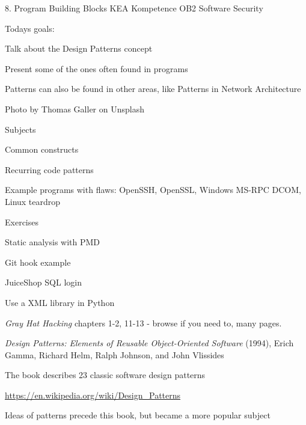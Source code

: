 \documentclass[Screen16to9,17pt]{foils}
\begin{document}
\mytitlepage
{8. Program Building Blocks}
{KEA Kompetence OB2 Software Security}




Todays goals:
\begin{list2}
\item Talk about the Design Patterns concept
\item Present some of the ones often found in programs
\item Patterns can also be found in other areas, like Patterns in Network Architecture
\end{list2}

  Photo by Thomas Galler on Unsplash


\begin{list1}
\item Subjects
\begin{list2}
\item Common constructs
\item Recurring code patterns
\item Example programs with flaws: OpenSSH, OpenSSL, Windows MS-RPC DCOM, Linux teardrop
\end{list2}
\item Exercises
\begin{list2}
\item Static analysis with PMD
\item Git hook example
\item JuiceShop SQL login
\item Use a XML library in Python
\end{list2}
\end{list1}


\begin{list1}
\item \emph{Gray Hat Hacking} chapters 1-2, 11-13 - browse if you need to, many pages.
\end{list1}




\begin{list2}
\item \emph{Design Patterns: Elements of Reusable Object-Oriented Software} (1994), Erich Gamma, Richard Helm, Ralph Johnson, and John Vlissides

\item The book describes 23 classic software design patterns

\item \url{https://en.wikipedia.org/wiki/Design_Patterns}

\item Ideas of patterns precede this book, but became a more popular subject
\end{list2}
\end{document}
